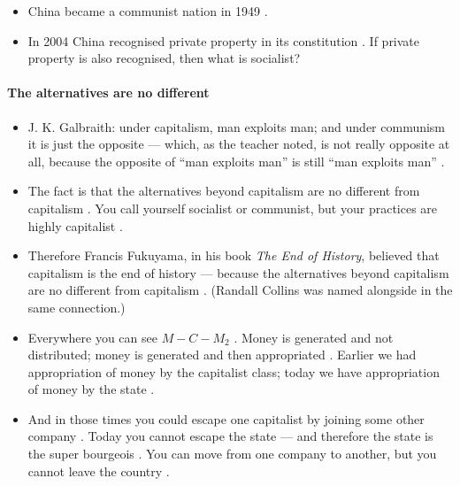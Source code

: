 \begin{DataFact}
\begin{itemize}
    \item China became a communist nation in 1949 .
    \item In 2004 China recognised private property in its constitution . If private property is also recognised, then what is socialist? 
\end{itemize}
\end{DataFact}

\paragraph{The alternatives are no different}
\begin{itemize}
    \item J. K. Galbraith: under capitalism, man exploits man; and under communism it is just the opposite --- which, as the teacher noted, is not really opposite at all, because the opposite of ``man exploits man'' is still ``man exploits man'' .
    \item The fact is that the alternatives beyond capitalism are no different from capitalism . You call yourself socialist or communist, but your practices are highly capitalist .
    \item Therefore Francis Fukuyama, in his book \emph{The End of History}, believed that capitalism is the end of history --- because the alternatives beyond capitalism are no different from capitalism . (Randall Collins was named alongside in the same connection.) 
    \item Everywhere you can see $M - C - M_2$ . Money is generated and not distributed; money is generated and then appropriated . Earlier we had appropriation of money by the capitalist class; today we have appropriation of money by the state .
    \item And in those times you could escape one capitalist by joining some other company . Today you cannot escape the state --- and therefore the state is the super bourgeois . You can move from one company to another, but you cannot leave the country .
\end{itemize}

